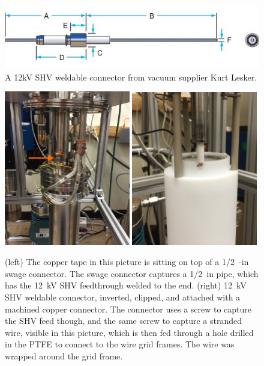  
\begin{figure}[htbp]
\begin{center}
\includegraphics[width=5in]{figures/testbed/12kV-SHV.jpg}
\caption{A 12kV SHV weldable connector from vacuum supplier Kurt Lesker.}
\label{fig:12kV-SHV}
\end{center}
\end{figure}

\begin{figure}[htbp]
\begin{center}
\includegraphics[width=0.49\textwidth]{figures/testbed/ft1_2.jpg}
\includegraphics[width=0.49\textwidth]{figures/testbed/ft1_1.jpg}
\caption{(left) The copper tape in this picture is sitting on top of a 1/2~-in swage connector. The swage connector captures a 1/2~in pipe, which has the 12~kV SHV feedthrough welded to the end. (right) 12~kV SHV weldable connector, inverted, clipped, and attached with a machined copper connector. The connector uses a screw to capture the SHV feed though, and the same screw to capture a stranded wire, visible in this picture, which is then fed through a hole drilled in the \ac{PTFE} to connect to the wire grid frames. The wire was wrapped around the grid frame. }
\label{fig:ft1}
\end{center}
\end{figure}

